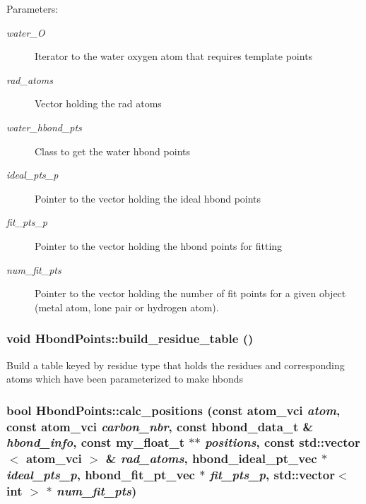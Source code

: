 \begin{Desc}
\item[Parameters:]
\begin{description}
\item[{\em water\_\-O}]Iterator to the water oxygen atom that requires template points \item[{\em rad\_\-atoms}]Vector holding the rad atoms \item[{\em water\_\-hbond\_\-pts}]Class to get the water hbond points \item[{\em ideal\_\-pts\_\-p}]Pointer to the vector holding the ideal hbond points \item[{\em fit\_\-pts\_\-p}]Pointer to the vector holding the hbond points for fitting \item[{\em num\_\-fit\_\-pts}]Pointer to the vector holding the number of fit points for a given object (metal atom, lone pair or hydrogen atom). \end{description}
\end{Desc}
\subsubsection{\setlength{\rightskip}{0pt plus 5cm}void Hbond\-Points::build\_\-residue\_\-table ()\hspace{0.3cm}{\tt  [private]}}\label{classASCbase_1_1HbondPoints_1d461841f496a487d56a8041b3443fc1}


Build a table keyed by residue type that holds the residues and corresponding atoms which have been parameterized to make hbonds 
\subsubsection{\setlength{\rightskip}{0pt plus 5cm}bool Hbond\-Points::calc\_\-positions (const atom\_\-vci {\em atom}, const atom\_\-vci {\em carbon\_\-nbr}, const hbond\_\-data\_\-t \& {\em hbond\_\-info}, const my\_\-float\_\-t $\ast$$\ast$ {\em positions}, const std::vector$<$ atom\_\-vci $>$ \& {\em rad\_\-atoms}, \bf{hbond\_\-ideal\_\-pt\_\-vec} $\ast$ {\em ideal\_\-pts\_\-p}, \bf{hbond\_\-fit\_\-pt\_\-vec} $\ast$ {\em fit\_\-pts\_\-p}, std::vector$<$ int $>$ $\ast$ {\em num\_\-fit\_\-pts})\hspace{0.3cm}{\tt  [private]}}\label{classASCbase_1_1HbondPoints_04d88991f26fd35fddb13e8fd9b24a02}


